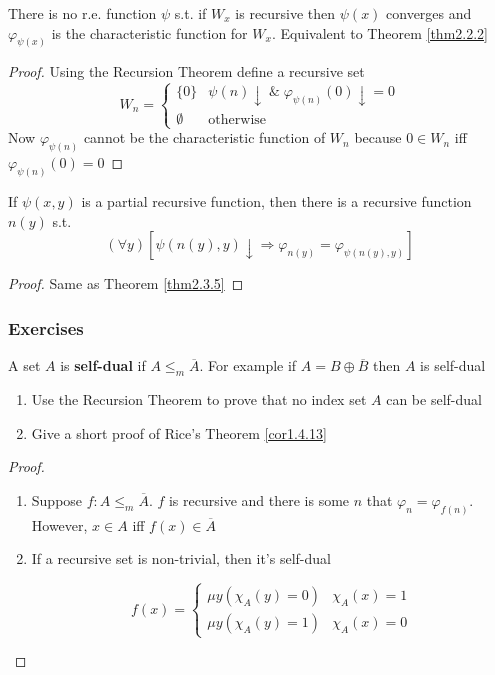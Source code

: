 \documentclass[11pt]{article}
\begin{document}
\begin{theorem}[]
There is no r.e. function \(\psi\) s.t. if \(W_x\) is recursive then \(\psi(x)\)
converges and \(\varphi_{\psi(x)}\) is the characteristic function for
\(W_x\). Equivalent to Theorem \ref{thm2.2.2}
\end{theorem}

\begin{proof}
Using the Recursion Theorem define a recursive set
\begin{equation*}
W_n=
\begin{cases}
\{0\}&\psi(n)\downarrow\;\&\;
\varphi_{\psi(n)}(0)\downarrow=0\\
\emptyset&\text{otherwise}
\end{cases}
\end{equation*}
Now \(\varphi_{\psi(n)}\) cannot be the characteristic function of \(W_n\)
because \(0\in W_n\) iff \(\varphi_{\psi(n)}(0)=0\)
\end{proof}

\begin{theorem}[]
If \(\psi(x,y)\) is a partial recursive function, then there is a recursive
function \(n(y)\) s.t.
\begin{equation*}
(\forall y)[\psi(n(y),y)\downarrow\Longrightarrow\varphi_{n(y)}=\varphi_{\psi(n(y),y)}]
\end{equation*}
\end{theorem}

\begin{proof}
Same as Theorem \ref{thm2.3.5}
\end{proof}
\subsubsection{Exercises}
\label{sec:org5afe97b}
\begin{exercise}
\label{ex2.3.8}
A set \(A\) is \textbf{self-dual} if \(A\le_m\overbar{A}\). For example if
\(A=B\oplus\overbar{B}\) then \(A\) is self-dual
\begin{enumerate}
\item Use the Recursion Theorem to prove that no index set \(A\) can be self-dual
\item Give a short proof of Rice's Theorem \ref{cor1.4.13}
\end{enumerate}
\end{exercise}

\begin{proof}
\begin{enumerate}
\item Suppose \(f:A\le_m\overbar{A}\). \(f\) is recursive and there is some
\(n\) that \(\varphi_n=\varphi_{f(n)}\). However, \(x\in A\) iff \(f(x)\in\overbar{A}\)
\item If a recursive set is non-trivial, then it's self-dual

\begin{equation*}
f(x)=
\begin{cases}
\mu y(\chi_A(y)=0)&\chi_A(x)=1\\
\mu y(\chi_A(y)=1)&\chi_A(x)=0
\end{cases}
\end{equation*}
\end{enumerate}
\end{proof}
\end{document}
